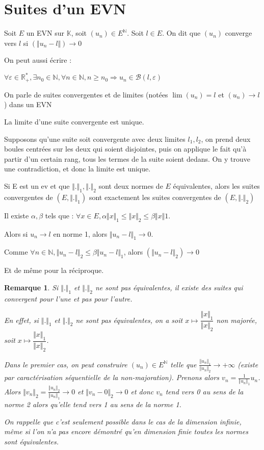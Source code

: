 \documentclass[a4paper,12pt]{book}
\newcommand{\Def}[2]{\begin{tcolorbox}[sharp corners, colback=white,colframe=blue!90!black!75, title=Définition : #1]#2\end{tcolorbox}}
\newcommand{\Thr}[2]{\begin{tcolorbox}[sharp corners, colback=white,colframe=red!90!black!75, title=Théorème : #1]#2\end{tcolorbox}}
\newcommand{\Prop}[2]{\begin{tcolorbox}[sharp corners, colback=white,colframe=red!90!black!75, title=Proposition : #1]#2\end{tcolorbox}}
\newcommand{\Pre}[1]{\begin{tcolorbox}[sharp corners, colback=white,colframe=green!60!green!30!black!75, title=Preuve]#1\end{tcolorbox}}
\newtheorem{Rem}{Remarque}[section]
\def\R{\mathbb{R}}
\def\N{\mathbb{N}}
\def\K{\mathbb{K}}
\begin{document}
\section{Suites d'un EVN}
\Def{Convergence}{Soit $E$ un EVN sur $\K$, soit $(u_n)\in E^\N$. Soit $l\in E$. On dit que $(u_n)$ converge vers $l$ si $(\Vert u_n-l\Vert)\to 0$
\par On peut aussi écrire :
\par\begin{center} $\forall\varepsilon\in\R_+^*, \exists n_0\in\N,\forall n\in\N, n\geq n_0\Rightarrow u_n\in\mathcal{B}(l, \varepsilon)$\end{center}
\par On parle de suites convergentes et de limites (notées $\lim (u_n)=l$ et $(u_n)\to l$) dans un EVN}
\Thr{Unicité de la limite}{La limite d'une suite convergente est unique.}
\Pre{Supposons qu'une suite soit convergente avec deux limites $l_1, l_2$, on prend deux boules centrées sur les deux qui soient disjointes, puis on applique le fait qu'à partir d'un certain rang, tous les termes de la suite soient dedans. On y trouve une contradiction, et donc la limite est unique.}
\Prop{Convergences équivalentes}{Si E est un ev et que $\Vert.\Vert_1, \Vert.\Vert_2$ sont deux normes de $E$ équivalentes, alors les suites convergentes de $(E, \Vert.\Vert_1)$ sont exactement les suites convergentes de $(E,\Vert.\Vert_2)$}
\Pre{Il existe $\alpha, \beta$ tels que : $\forall x\in E, \alpha \Vert x\Vert_1\leq \Vert x\Vert_2\leq \beta\Vert x\Vert1$.
\par Alors si $u_n\to l$ en norme 1, alors $\Vert u_n - l\Vert_1\to 0$.
\par Comme $\forall n\in\N, \Vert u_n-l\Vert_2 \leq \beta\Vert u_n-l\Vert_1$, alors $(\Vert u_n-l\Vert_2)\to 0$
\par Et de même pour la réciproque.}
\begin{Rem}
Si $\Vert.\Vert_1$ et $\Vert.\Vert_2$ ne sont pas équivalentes, il existe des suites qui convergent pour l'une et pas pour l'autre.
\par En effet, si $\Vert.\Vert_1$ et $\Vert.\Vert_2$ ne sont pas équivalentes, on a soit $x\mapsto\dfrac{\Vert x\Vert_1}{\Vert x\Vert_2}$ non majorée, soit $x\mapsto\dfrac{\Vert x\Vert_1}{\Vert x\Vert_2}$.
\par Dans le premier cas, on peut construire $(u_n)\in E^\N$ telle que $\frac{\Vert u_n\Vert_1}{\Vert u_n\Vert_2}\to+\infty$ (existe par caractérisation séquentielle de la non-majoration). Prenons alors $v_n = \frac{1}{\Vert u_n\Vert_1}u_n$. Alors $\Vert v_n\Vert_2 = \frac{\Vert u_n\Vert_2}{\Vert u_n\Vert_1}\to 0$ et $\Vert v_n-0\Vert_2\to 0$ et donc $v_n$ tend vers 0 au sens de la norme 2 alors qu'elle tend vers 1 au sens de la norme 1.
\par On rappelle que c'est seulement possible dans le cas de la dimension infinie, même si l'on n'a pas encore démontré qu'en dimension finie toutes les normes sont équivalentes.
\end{Rem}
\end{document}
